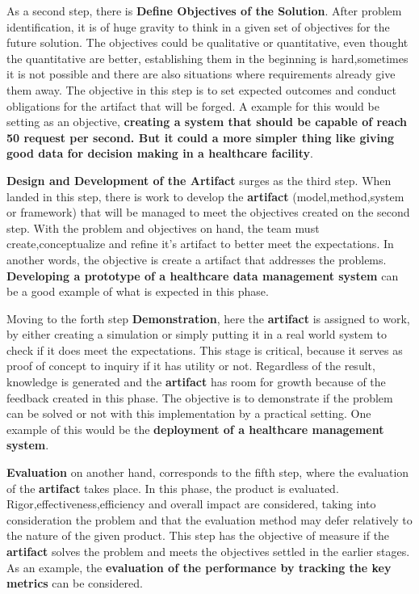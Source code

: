 As a second step, there is \textbf{Define Objectives of the Solution}. After problem identification, it is of huge gravity to think in a given set of objectives for the future solution. The objectives could be qualitative or quantitative, even thought the quantitative are better, establishing them in the beginning is hard,sometimes it is not possible and there are also situations where requirements already give them away. The objective in this step is to set expected outcomes and conduct obligations for the artifact that will be forged. A example for this would be setting as an objective, \textbf{creating a system that should be capable of reach 50 request per second. But it could a more simpler thing like giving good data for decision making in a healthcare facility}.

\textbf{Design and Development of the Artifact} surges as the third step. When landed in this step, there is work to develop the \textbf{artifact} (model,method,system or framework) that will be managed to meet the objectives created on the second step. With the problem and objectives on hand, the team must create,conceptualize and refine it's artifact to better meet the expectations. In another words, the objective is create a artifact that addresses the problems. \textbf{Developing a prototype of a healthcare data management system} can be a good example of what is expected in this phase.

 Moving to the forth step \textbf{Demonstration}, here the \textbf{artifact} is assigned to work, by either creating a simulation or simply putting it in a real world system to check if it does meet the expectations. This stage is critical, because it serves as proof of concept to inquiry if it has utility or not. Regardless of the result, knowledge is generated and the \textbf{artifact} has room for growth because of the feedback created in this phase. The objective is to demonstrate if the problem can be solved or not with this implementation by a practical setting. One example of this would be the \textbf{deployment of a healthcare management system}.

 \textbf{Evaluation} on another hand, corresponds to the fifth step, where the evaluation of the \textbf{artifact} takes place. In this phase, the product is evaluated. Rigor,effectiveness,efficiency and overall impact are considered, taking into consideration the problem and that the evaluation method may defer relatively to the nature of the given product. This step has the objective of measure if the \textbf{artifact} solves the problem and meets the objectives settled in the earlier stages. As an example, the \textbf{evaluation of the performance by tracking the key metrics} can be considered.

